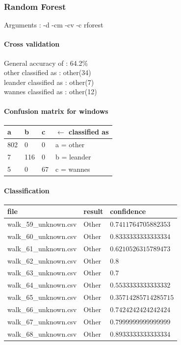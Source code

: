 \subsubsection{Random Forest}
Arguments : -d -cm -cv -c rforest 
\paragraph{Cross validation}
General accuracy of : 64.2\%\\
other classified as : other(34) \\
leander classified as : other(7) \\
wannes classified as : other(12)

\paragraph{Confusion matrix for windows}

\begin{tabular}{l l l | l}
    a &    b &   c & $\leftarrow$ classified as \\
    \hline
   802 & 0 & 0 &    a = other \\
   7 & 116 & 0 &    b = leander \\
    5 & 0 & 67 &    c = wannes
\end{tabular}

\paragraph{Classification}
\begin{tabular}{l | l | l}
    file & result & confidence\\ 
    \hline 
    walk\_59\_unknown.csv & Other   & $0.7411764705882353$ \\
    walk\_60\_unknown.csv & Other   & $0.8333333333333334$ \\
    walk\_61\_unknown.csv & Other   & $0.6210526315789473$ \\
    walk\_62\_unknown.csv & Other   & $0.8$ \\
    walk\_63\_unknown.csv & Other   & $0.7$ \\
    walk\_64\_unknown.csv & Other   & $0.5533333333333332$ \\
    walk\_65\_unknown.csv & Other   & $0.35714285714285715$ \\
    walk\_66\_unknown.csv & Other   & $0.7424242424242424$ \\
    walk\_67\_unknown.csv & Other   & $0.7999999999999999$ \\
    walk\_68\_unknown.csv & Other   & $0.8933333333333334$
\end{tabular}



